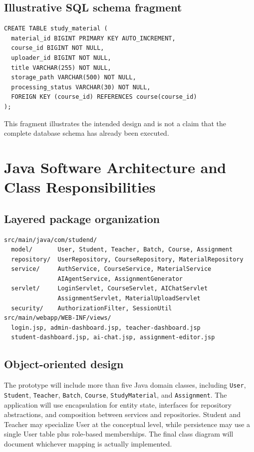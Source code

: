\documentclass[11pt,a4paper]{article}
\begin{document}
\subsection{Illustrative SQL schema fragment}
\begin{verbatim}
CREATE TABLE study_material (
  material_id BIGINT PRIMARY KEY AUTO_INCREMENT,
  course_id BIGINT NOT NULL,
  uploader_id BIGINT NOT NULL,
  title VARCHAR(255) NOT NULL,
  storage_path VARCHAR(500) NOT NULL,
  processing_status VARCHAR(30) NOT NULL,
  FOREIGN KEY (course_id) REFERENCES course(course_id)
);
\end{verbatim}
This fragment illustrates the intended design and is not a claim that the complete database schema has already been executed.

\section{Java Software Architecture and Class Responsibilities}
\subsection{Layered package organization}
\begin{verbatim}
src/main/java/com/studend/
  model/       User, Student, Teacher, Batch, Course, Assignment
  repository/  UserRepository, CourseRepository, MaterialRepository
  service/     AuthService, CourseService, MaterialService
               AIAgentService, AssignmentGenerator
  servlet/     LoginServlet, CourseServlet, AIChatServlet
               AssignmentServlet, MaterialUploadServlet
  security/    AuthorizationFilter, SessionUtil
src/main/webapp/WEB-INF/views/
  login.jsp, admin-dashboard.jsp, teacher-dashboard.jsp
  student-dashboard.jsp, ai-chat.jsp, assignment-editor.jsp
\end{verbatim}
\subsection{Object-oriented design}
The prototype will include more than five Java domain classes, including \texttt{User}, \texttt{Student}, \texttt{Teacher}, \texttt{Batch}, \texttt{Course}, \texttt{StudyMaterial}, and \texttt{Assignment}. The application will use encapsulation for entity state, interfaces for repository abstractions, and composition between services and repositories. Student and Teacher may specialize User at the conceptual level, while persistence may use a single User table plus role-based memberships. The final class diagram will document whichever mapping is actually implemented.
\end{document}
